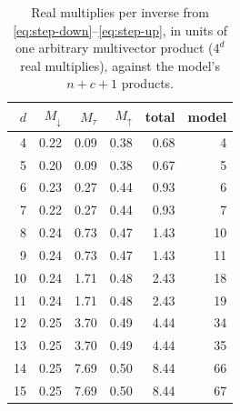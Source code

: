 \begin{table}[t]
\centering
\caption{Real multiplies per inverse from \eqref{eq:step-down}--\eqref{eq:step-up}, in units of one arbitrary multivector product ($4^d$ real multiplies), against the model's $n+c+1$ products.}
\label{tab:tau-mults}
\begin{tabular}{rrrrrr}
\toprule
$d$ & $M_{\downarrow}$ & $M_{\tau}$ & $M_{\uparrow}$ & total & model \\
\midrule
4 & 0.22 & 0.09 & 0.38 & 0.68 & 4 \\
5 & 0.20 & 0.09 & 0.38 & 0.67 & 5 \\
6 & 0.23 & 0.27 & 0.44 & 0.93 & 6 \\
7 & 0.22 & 0.27 & 0.44 & 0.93 & 7 \\
\midrule
8 & 0.24 & 0.73 & 0.47 & 1.43 & 10 \\
9 & 0.24 & 0.73 & 0.47 & 1.43 & 11 \\
10 & 0.24 & 1.71 & 0.48 & 2.43 & 18 \\
11 & 0.24 & 1.71 & 0.48 & 2.43 & 19 \\
\midrule
12 & 0.25 & 3.70 & 0.49 & 4.44 & 34 \\
13 & 0.25 & 3.70 & 0.49 & 4.44 & 35 \\
14 & 0.25 & 7.69 & 0.50 & 8.44 & 66 \\
15 & 0.25 & 7.69 & 0.50 & 8.44 & 67 \\
\bottomrule
\end{tabular}
\end{table}
